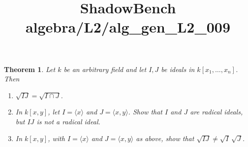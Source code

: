 \documentclass{article}
\title{ShadowBench algebra/L2/alg\_gen\_L2\_009}
\newtheorem{theorem}{Theorem}
\begin{document}
\maketitle

\begin{theorem}
Let $k$ be an arbitrary field and let $I,J$ be ideals in $k[x_1,\ldots,x_n]$.
Then
\begin{enumerate}
  \item $\sqrt{IJ} = \sqrt{I \cap J}$.

  \item In $k[x,y]$, let $I=\langle x\rangle$ and $J=\langle x,y\rangle$.
  Show that $I$ and $J$ are radical ideals, but $IJ$ is not a radical ideal.

  \item In $k[x,y]$, with $I=\langle x\rangle$ and $J=\langle x,y\rangle$ as above,
  show that $\sqrt{IJ} \neq \sqrt{I}\,\sqrt{J}$.
\end{enumerate}
\end{theorem}
\end{document}
